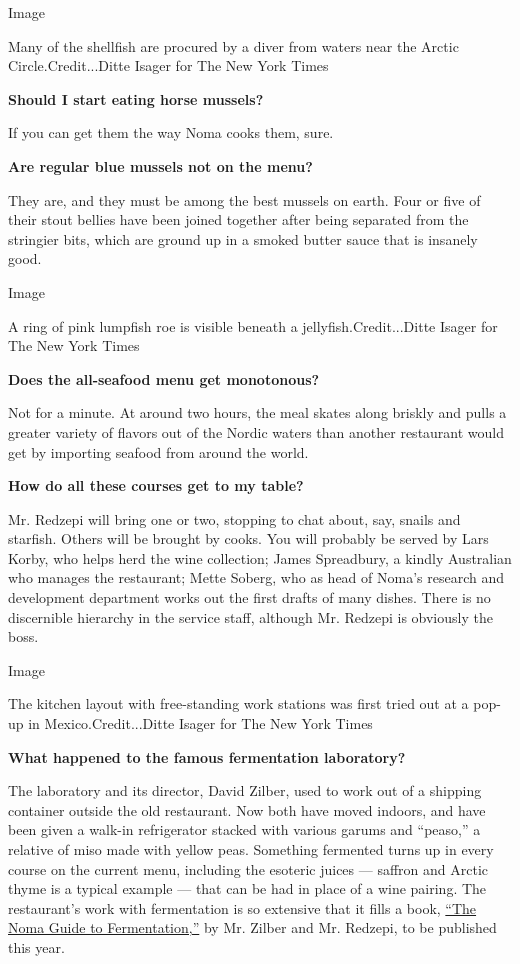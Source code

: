 Image

Many of the shellfish are procured by a diver from waters near the
Arctic Circle.Credit...Ditte Isager for The New York Times

\textbf{Should I start eating horse mussels?}

If you can get them the way Noma cooks them, sure.

\textbf{Are regular blue mussels not on the menu?}

They are, and they must be among the best mussels on earth. Four or five
of their stout bellies have been joined together after being separated
from the stringier bits, which are ground up in a smoked butter sauce
that is insanely good.

Image

A ring of pink lumpfish roe is visible beneath a
jellyfish.Credit...Ditte Isager for The New York Times

\textbf{Does the all-seafood menu get monotonous?}

Not for a minute. At around two hours, the meal skates along briskly and
pulls a greater variety of flavors out of the Nordic waters than another
restaurant would get by importing seafood from around the world.

\textbf{How do all these courses get to my table?}

Mr. Redzepi will bring one or two, stopping to chat about, say, snails
and starfish. Others will be brought by cooks. You will probably be
served by Lars Korby, who helps herd the wine collection; James
Spreadbury, a kindly Australian who manages the restaurant; Mette
Soberg, who as head of Noma's research and development department works
out the first drafts of many dishes. There is no discernible hierarchy
in the service staff, although Mr. Redzepi is obviously the boss.

Image

The kitchen layout with free-standing work stations was first tried out
at a pop-up in Mexico.Credit...Ditte Isager for The New York Times

\textbf{What happened to the famous fermentation laboratory?}

The laboratory and its director, David Zilber, used to work out of a
shipping container outside the old restaurant. Now both have moved
indoors, and have been given a walk-in refrigerator stacked with various
garums and ``peaso,'' a relative of miso made with yellow peas.
Something fermented turns up in every course on the current menu,
including the esoteric juices --- saffron and Arctic thyme is a typical
example --- that can be had in place of a wine pairing. The restaurant's
work with fermentation is so extensive that it fills a book,
\href{https://www.workman.com/products/the-noma-guide-to-fermentation-foundations-of-flavor}{``The
Noma Guide to Fermentation,''} by Mr. Zilber and Mr. Redzepi, to be
published this year.

